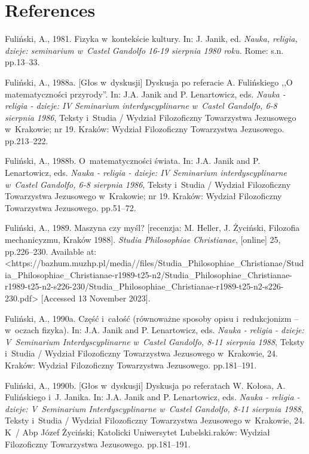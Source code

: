 \section{References}

Fuliński, A., 1981. Fizyka w~kontekście kultury. In: J. Janik, ed. \textit{Nauka, religia, dzieje: seminarium w~Castel Gandolfo 16-19 sierpnia 1980 roku.} Rome: s.n. pp.13–33.



Fuliński, A., 1988a. [Głos w~dyskusji] Dyskusja po referacie A. Fulińskiego ,,O matematyczności przyrody''. In: J.A. Janik and P. Lenartowicz, eds. \textit{Nauka - religia - dzieje: IV Seminarium interdyscyplinarne w~Castel Gandolfo, 6-8 sierpnia 1986}, Teksty i~Studia / Wydział Filozoficzny Towarzystwa Jezusowego w~Krakowie; nr 19. Kraków: Wydział Filozoficzny Towarzystwa Jezusowego. pp.213–222.



Fuliński, A., 1988b. O~matematyczności świata. In: J.A. Janik and P. Lenartowicz, eds. \textit{Nauka - religia - dzieje: IV Seminarium interdyscyplinarne w~Castel Gandolfo, 6-8 sierpnia 1986}, Teksty i~Studia / Wydział Filozoficzny Towarzystwa Jezusowego w~Krakowie; nr 19. Kraków: Wydział Filozoficzny Towarzystwa Jezusowego. pp.51–72.



Fuliński, A., 1989. Maszyna czy myśl? [recenzja: M. Heller, J. Życiński, Filozofia mechanicyzmu, Kraków 1988]. \textit{Studia Philosophiae Christianae}, [online] 25, pp.226–230. Available at: {\textless}https://bazhum.muzhp.pl/media//files/Studia\_Philosophiae\_Christianae/Studia\_Philosophiae\_Christianae-r1989-t25-n2/Studia\_Philosophiae\_Christianae-r1989-t25-n2-s226-230/Studia\_Philosophiae\_Christianae-r1989-t25-n2-s226-230.pdf{\textgreater} [Accessed 13 November 2023].



Fuliński, A., 1990a. Część i~całość (równoważne sposoby opisu i~redukcjonizm -- w~oczach fizyka). In: J.A. Janik and P. Lenartowicz, eds. \textit{Nauka - religia - dzieje: V~Seminarium Interdyscyplinarne w~Castel Gandolfo, 8-11 sierpnia 1988}, Teksty i~Studia / Wydział Filozoficzny Towarzystwa Jezusowego w~Krakowie, 24. Kraków: Wydział Filozoficzny Towarzystwa Jezusowego. pp.181–191.



Fuliński, A., 1990b. [Głos w~dyskusji] Dyskusja po referatach W. Kołosa, A. Fulińskiego i~J. Janika. In: J.A. Janik and P. Lenartowicz, eds. \textit{Nauka - religia - dzieje: V~Seminarium Interdyscyplinarne w~Castel Gandolfo, 8-11 sierpnia 1988}, Teksty i~Studia / Wydział Filozoficzny Towarzystwa Jezusowego w~Krakowie, 24. K~/ Abp Józef Życiński; Katolicki Uniwersytet Lubelski.raków: Wydział Filozoficzny Towarzystwa Jezusowego. pp.181–191.




